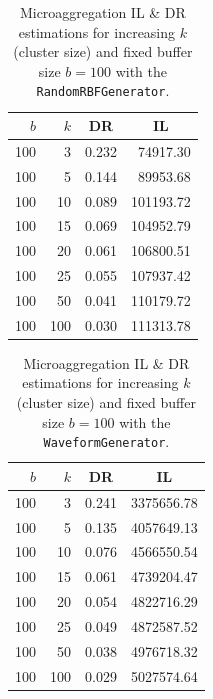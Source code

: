 \begin{minipage}[t]{0.5\textwidth}
	\begin{flushleft}
	\begin{table}[H]
		\centering
		\begin{tabular}{@{}rrrr@{}}
			\toprule
			$b$ & $k$ & \multicolumn{1}{c}{DR} & \multicolumn{1}{c}{IL} \\ \midrule
			100  & 3   & 0.232 & 74917.30  \\
			100  & 5   & 0.144 & 89953.68  \\
			100  & 10  & 0.089 & 101193.72 \\
			100  & 15  & 0.069 & 104952.79 \\
			100  & 20  & 0.061 & 106800.51 \\
			100  & 25  & 0.055 & 107937.42 \\
			100  & 50  & 0.041 & 110179.72 \\
			100  & 100 & 0.030 & 111313.78 \\ \bottomrule
		\end{tabular}
		\caption[Microaggregation DR \& IL estimations (\texttt{RandomRBFGenerator}).]{Microaggregation IL \& DR estimations for increasing $k$ (cluster size) and fixed buffer size $b=100$ with the \texttt{RandomRBFGenerator}.}
		\label{table:results-rbf-microaggregation}
	\end{table}
	\end{flushleft}
\end{minipage}
\begin{minipage}[t]{0.5\textwidth}
	\begin{flushright}
	\begin{table}[H]
		\centering
		\begin{tabular}{@{}rrrr@{}}
			\toprule
			$b$ & $k$ & \multicolumn{1}{c}{DR} & \multicolumn{1}{c}{IL} \\ \midrule
			100  & 3   & 0.241 & 3375656.78 \\
			100  & 5   & 0.135 & 4057649.13 \\
			100  & 10  & 0.076 & 4566550.54 \\
			100  & 15  & 0.061 & 4739204.47 \\
			100  & 20  & 0.054 & 4822716.29 \\
			100  & 25  & 0.049 & 4872587.52 \\
			100  & 50  & 0.038 & 4976718.32 \\
			100  & 100 & 0.029 & 5027574.64 \\ \bottomrule
		\end{tabular}
		\caption[Microaggregation DR \& IL estimations (\texttt{WaveformGenerator}).]{Microaggregation IL \& DR estimations for increasing $k$ (cluster size) and fixed buffer size $b=100$ with the \texttt{WaveformGenerator}.}
		\label{table:results-wave-microaggregation}
	\end{table}
	\end{flushright}
\end{minipage}

